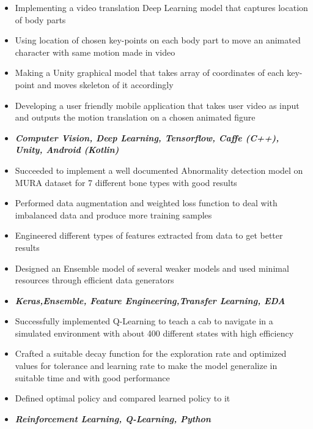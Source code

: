 

\begin{itemize}
\item Implementing a video translation Deep Learning model that captures location of body parts
\item Using location of chosen key-points on each body part to move an animated character with same motion made in video
\item Making a Unity graphical model that takes array of coordinates of each key-point and moves skeleton of it accordingly
\item Developing a user friendly mobile application that takes user video as input and outputs the motion translation on a chosen animated figure
\item \textit{\textbf{Computer Vision, Deep Learning, Tensorflow, Caffe (C++), Unity, Android (Kotlin)}}
\end{itemize}
\divider

\begin{itemize}
\item Succeeded to implement a well documented Abnormality detection model on MURA dataset for 7 different bone types with good results
\item Performed data augmentation and weighted loss function to deal with imbalanced data and produce more training samples
\item Engineered different types of features extracted from data to get better results
\item Designed an Ensemble model of several weaker models and used minimal resources through efficient data generators
\item \textit{\textbf{Keras,Ensemble, Feature Engineering,Transfer Learning, EDA }}
\end{itemize}

\divider
{}
\begin{itemize}
\item Successfully implemented Q-Learning to teach a cab to navigate in a simulated environment with about 400 different states with high efficiency
\item Crafted a suitable decay function for the exploration rate and optimized values for tolerance and learning rate to make the model generalize in suitable time and with good performance
\item Defined optimal policy and compared learned policy to it
\item \textit{\textbf{Reinforcement Learning, Q-Learning, Python}}
\end{itemize}


